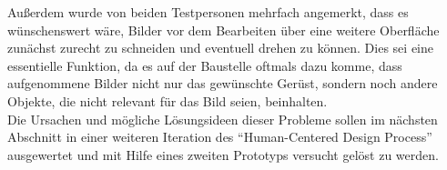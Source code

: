 Außerdem wurde von beiden Testpersonen mehrfach angemerkt, dass es wünschenswert wäre, Bilder vor dem Bearbeiten über eine weitere Oberfläche zunächst zurecht zu schneiden und eventuell drehen zu können.
Dies sei eine essentielle Funktion, da es auf der Baustelle oftmals dazu komme, dass aufgenommene Bilder nicht nur das gewünschte Gerüst, sondern noch andere Objekte, die nicht relevant für das Bild seien, beinhalten. \\

Die Ursachen und mögliche Lösungsideen dieser Probleme sollen im nächsten Abschnitt in einer weiteren Iteration des ``Human-Centered Design Process'' ausgewertet und mit Hilfe eines zweiten Prototyps versucht gelöst zu werden.
